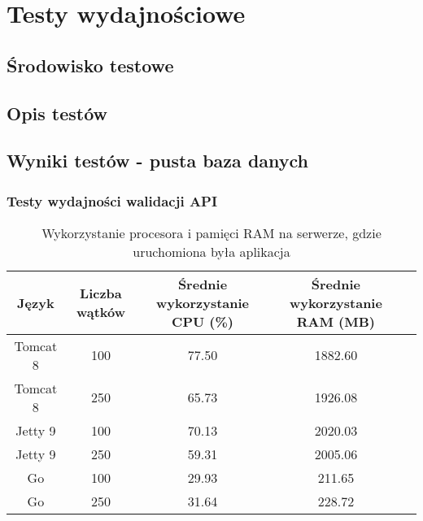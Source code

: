 \chapter{Testy wydajnościowe}
\section{Środowisko testowe}
\section{Opis testów}
\section{Wyniki testów - pusta baza danych}

\newpage
\subsection{Testy wydajności walidacji API}
% 

\begin{table}[!htb]
\centering
\caption{Wykorzystanie procesora i pamięci RAM na serwerze, gdzie uruchomiona była aplikacja}
\label{tab:app-clean-api}
\begin{tabular}{@{}ccccl@{}}
\toprule
\textbf{Język} & \textbf{Liczba wątków} & \multicolumn{1}{p{3cm}}{\textbf{Średnie wykorzystanie CPU (\%)}} & \multicolumn{1}{p{3cm}}{\textbf{Średnie wykorzystanie RAM (MB)}} &  \\ \midrule
Tomcat 8       & 100                    & 77.50                             & 1882.60                          &  \\
Tomcat 8       & 250                    & 65.73                             & 1926.08                          &  \\
Jetty 9       & 100                    & 70.13                             & 2020.03                          &  \\
Jetty 9       & 250                    & 59.31                             & 2005.06                          &  \\
Go       & 100                    & 29.93                             & 211.65                          &  \\
Go       & 250                    & 31.64                             & 228.72                          &  \\
\bottomrule
\end{tabular}
\end{table}

